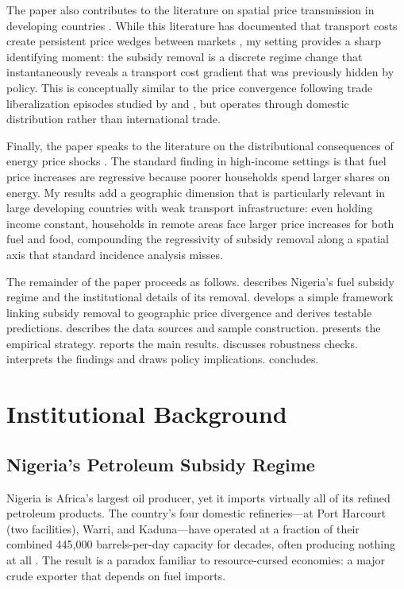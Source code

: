 \documentclass[12pt]{article}
\begin{document}
The paper also contributes to the literature on spatial price transmission in developing countries \citep{Aker2010,Atkin2015,Fackler2001}. While this literature has documented that transport costs create persistent price wedges between markets \citep{Donaldson2018,Sotelo2020}, my setting provides a sharp identifying moment: the subsidy removal is a discrete regime change that instantaneously reveals a transport cost gradient that was previously hidden by policy. This is conceptually similar to the price convergence following trade liberalization episodes studied by \citet{Atkin2015} and \citet{Donaldson2018}, but operates through domestic distribution rather than international trade.

Finally, the paper speaks to the literature on the distributional consequences of energy price shocks \citep{Allcott2019,Borenstein2012,Davis2014}. The standard finding in high-income settings is that fuel price increases are regressive because poorer households spend larger shares on energy. My results add a geographic dimension that is particularly relevant in large developing countries with weak transport infrastructure: even holding income constant, households in remote areas face larger price increases for both fuel and food, compounding the regressivity of subsidy removal along a spatial axis that standard incidence analysis misses.

The remainder of the paper proceeds as follows.  describes Nigeria's fuel subsidy regime and the institutional details of its removal.  develops a simple framework linking subsidy removal to geographic price divergence and derives testable predictions.  describes the data sources and sample construction.  presents the empirical strategy.  reports the main results.  discusses robustness checks.  interprets the findings and draws policy implications.  concludes.


\section{Institutional Background}
\label{sec:background}

\subsection{Nigeria's Petroleum Subsidy Regime}

Nigeria is Africa's largest oil producer, yet it imports virtually all of its refined petroleum products. The country's four domestic refineries---at Port Harcourt (two facilities), Warri, and Kaduna---have operated at a fraction of their combined 445,000 barrels-per-day capacity for decades, often producing nothing at all \citep{Adeosun2023}. The result is a paradox familiar to resource-cursed economies: a major crude exporter that depends on fuel imports.
\end{document}
